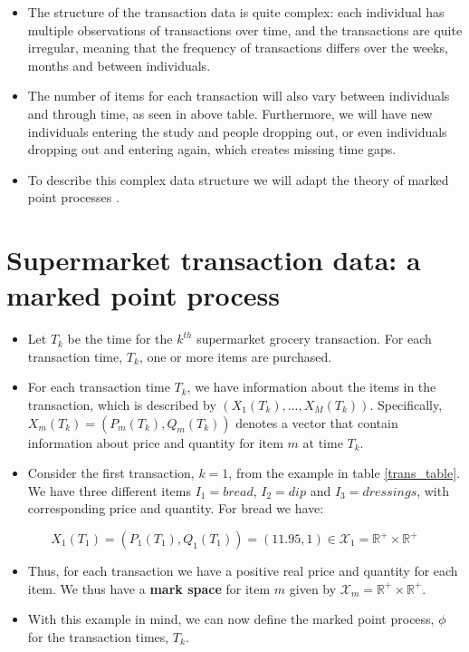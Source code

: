 \documentclass[
  11pt,
]{article}
\providecommand{\tightlist}{%
  \setlength{\itemsep}{0pt}\setlength{\parskip}{0pt}}
\begin{document}
\begin{itemize}
\tightlist
\item
  The structure of the transaction data is quite complex: each
  individual has multiple observations of transactions over time, and
  the transactions are quite irregular, meaning that the frequency of
  transactions differs over the weeks, months and between individuals.
\item
  The number of items for each transaction will also vary between
  individuals and through time, as seen in above table. Furthermore, we
  will have new individuals entering the study and people dropping out,
  or even individuals dropping out and entering again, which creates
  missing time gaps.
\item
  To describe this complex data structure we will adapt the theory of
  marked point processes \cite{kar} \cite{last}.
\end{itemize}

\hypertarget{supermarket-transaction-data-a-marked-point-process}{%
\section{Supermarket transaction data: a marked point
process}\label{supermarket-transaction-data-a-marked-point-process}}

\begin{itemize}
\tightlist
\item
  Let \(T_k\) be the time for the \(k^{th}\) supermarket grocery
  transaction. For each transaction time, \(T_k\), one or more items are
  purchased.
\item
  For each transaction time \(T_k\), we have information about the items
  in the transaction, which is described by
  \((X_{1}(T_k),...,X_{M}(T_k))\). Specifically,
  \(X_{m}(T_k)=(P_{m}(T_k), Q_{m}(T_k))\) denotes a vector that contain
  information about price and quantity for item \(m\) at time \(T_k\).
\item
  Consider the first transaction, \(k=1\), from the example in table
  \ref{trans_table}. We have three different items \(I_1=bread\),
  \(I_2=dip\) and \(I_3=dressings\), with corresponding price and
  quantity. For bread we have:
\end{itemize}

\[
X_1(T_1) = (P_1(T_1), Q_1(T_1))=(11.95,1) \in \mathcal{X}_1 = \mathbb{R}^+ \times \mathbb{R}^+
\]

\begin{itemize}
\tightlist
\item
  Thus, for each transaction we have a positive real price and quantity
  for each item. We thus have a \textbf{mark space} for item \(m\) given
  by \(\mathcal{X}_m = \mathbb{R}^+ \times \mathbb{R}^+\).
\item
  With this example in mind, we can now define the marked point process,
  \(\phi\) for the transaction times, \(T_k\).
\end{itemize}
\end{document}
